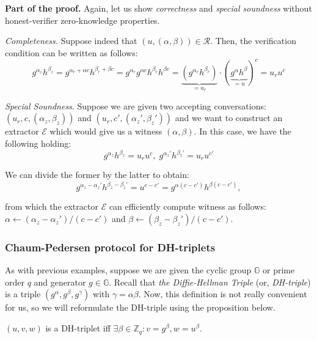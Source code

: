 \documentclass[../lecture-notes-148x210.tex]{subfiles}
\begin{document}
\textbf{Part of the proof.} Again, let us show \textit{correctness} and \textit{special soundness} without honest-verifier zero-knowledge properties.

\textit{Completeness.} Suppose indeed that $(u,(\alpha,\beta)) \in \mathcal{R}$. Then, the verification condition can be written as follows:
\begin{equation*}
    g^{\alpha_z}h^{\beta_z} = g^{\alpha_r + \alpha c}h^{\beta_r + \beta c} = g^{\alpha_r}g^{\alpha c}h^{\beta_r}h^{\beta c} = \underbrace{(g^{\alpha_r}h^{\beta_r})}_{=u_r} \cdot (\underbrace{g^{\alpha}h^{\beta}}_{=u})^c = u_r u^c
\end{equation*}

\textit{Special Soundness}. Suppose we are given two accepting conversations: $(u_r,c,(\alpha_z,\beta_z))$ and $(u_r,c',(\alpha_z',\beta_z'))$ and we want to construct an extractor $\mathcal{E}$ which would give us a witness $(\alpha,\beta)$. In this case, we have the following holding:
\begin{equation*}
    g^{\alpha_z}h^{\beta_z} = u_r u^c, \; g^{\alpha_z'}h^{\beta_z'} = u_r u^{c'}
\end{equation*}

We can divide the former by the latter to obtain:
\begin{equation*}
    g^{\alpha_z - \alpha_z'}h^{\beta_z - \beta_z'} = u^{c-c'} = g^{\alpha(c-c')}h^{\beta(c-c')},
\end{equation*}

from which the extractor $\mathcal{E}$ can efficiently compute witness as follows: $\alpha \gets (\alpha_z - \alpha_z')\big/(c-c')$ and $\beta \gets (\beta_z - \beta_z')\big/(c-c')$.

\subsubsection{Chaum-Pedersen protocol for DH-triplets}

As with previous examples, suppose we are given the cyclic group $\mathbb{G}$ or prime order $q$ and generator $g \in \mathbb{G}$. Recall that \textit{the Diffie-Hellman Triple} (or, \textit{DH-triple}) is a triple $(g^{\alpha},g^{\beta},g^{\gamma})$ with $\gamma=\alpha\beta$. Now, this definition is not really convenient for us, so we will reformulate the DH-triple using the proposition below.

\begin{proposition}
    $(u,v,w)$ is a DH-triplet iff $\exists \beta \in \mathbb{Z}_q: v = g^{\beta}, w = u^{\beta}$.
\end{proposition}
\end{document}
